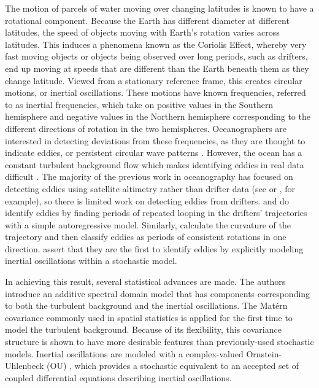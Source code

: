 \documentclass{stat572Style}
\begin{document}
\par
The motion of parcels of water moving over changing latitudes is known to have a rotational component. 
Because the Earth has  different diameter at different latitudes, the speed of objects moving with Earth's rotation varies across latitudes.  
This induces a phenomena known as the Coriolis Effect, whereby very fast moving objects or objects being observed over long periods, such as drifters, end up moving at speeds that are different than the Earth beneath them as they change latitude. 
Viewed from a stationary reference frame, this creates circular motions, or inertial oscillations. 
These motions have known frequencies, referred to as inertial frequencies, which take on positive values in the Southern hemisphere and negative values in the Northern hemisphere corresponding to the different directions of rotation in the two hemispheres.
 Oceanographers  are interested in detecting deviations from these frequencies, as they are thought to indicate eddies, or persistent circular wave patterns \citep{Kunze1985}.
  However, the ocean has a constant turbulent background flow which makes identifying eddies in real data difficult \citep{ Elipot2010}.
 The majority of the previous work in oceanography has focused on detecting eddies using satellite altimetry rather than drifter data (see \citet{Isern2003} or \citet{Fu2010}, for example), so there is limited work on detecting eddies from drifters.
\citet{Shoosmith2005} and \citet{Lankhorst2006} do identify eddies by finding periods of repeated looping in the drifters' trajectories with a simple autoregressive model.
 Similarly, \citet{Boebel2003} calculate the curvature of the trajectory  and then classify eddies as periods of consistent rotations in one direction. 
 \citet{Sykulski2016} assert that they are the first to identify eddies by explicitly modeling inertial oscillations within a stochastic model.  
 \par
In achieving this result, several statistical advances are made.  
The authors introduce an additive spectral domain model that has components corresponding to both the turbulent background and the inertial oscillations. 
The Mat\'{e}rn covariance commonly used in spatial statistics \citep{Gneiting2012} is applied for the first time to model the turbulent background. 
Because of its flexibility, this covariance structure is shown to have more desirable features than previously-used stochastic models. 
Inertial oscillations are modeled with a complex-valued Ornstein-Uhlenbeck (OU) \citep{Arato1962, Jeffreys1968}, which provides a stochastic equivalent to an accepted set of coupled differential equations describing inertial oscillations. 
\end{document}
